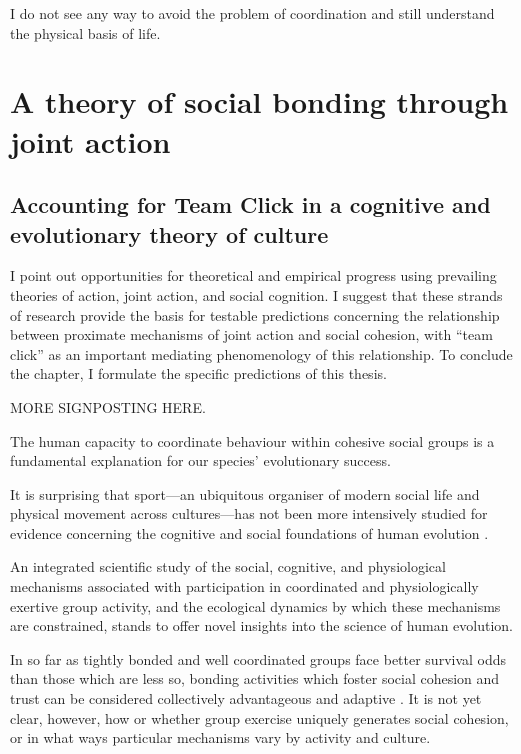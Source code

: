 

\begin{savequote}[8cm]

  I do not see any way to avoid the problem of coordination and still understand the physical basis of life.

\end{savequote}




\chapter{\label{theoryContribution}A theory of social bonding through joint action}



\section{Accounting for Team Click in a cognitive and evolutionary theory of culture}

I point out opportunities for theoretical and empirical progress using prevailing theories of action, joint action, and social cognition. I suggest that these strands of research provide the basis for testable predictions concerning the relationship between proximate mechanisms of joint action and social cohesion, with ``team click'' as an important mediating phenomenology of this relationship.  To conclude the chapter, I formulate the specific predictions of this thesis.


MORE SIGNPOSTING HERE.


The human capacity to coordinate behaviour within cohesive social groups is a fundamental explanation for our species' evolutionary success.

It is surprising that sport---an ubiquitous organiser of modern social life and physical movement across cultures---has not been more intensively studied for evidence concerning the cognitive and social foundations of human evolution \citep{Blanchard1995,Downey2005a}.

An integrated scientific study of the social, cognitive, and physiological mechanisms associated with participation in coordinated and physiologically exertive group activity, and the ecological dynamics by which these mechanisms are constrained, stands to offer novel insights into the science of human evolution.

 In so far as tightly bonded and well coordinated groups face better survival odds than those which are less so, bonding activities which foster social cohesion and trust can be considered collectively advantageous and adaptive \citep{Dunbar2010}.  It is not yet clear, however, how or whether group exercise uniquely generates social cohesion, or in what ways particular mechanisms vary by activity and culture.

